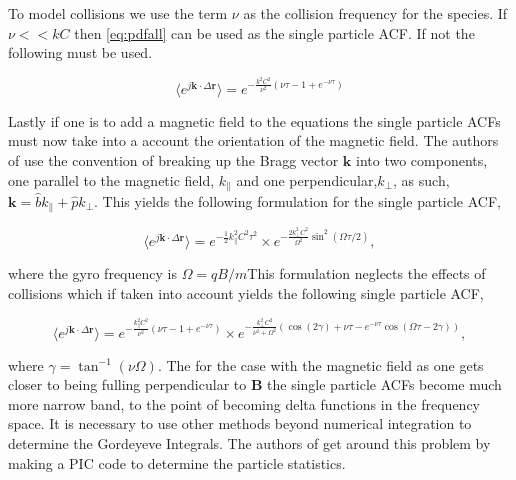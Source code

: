 \documentclass[10pt]{report}
\begin{document}
 To model collisions we use the term $\nu$ as the collision frequency for the species. If $\nu<<kC$ then \ref{eq:pdfall} can be used as the single particle ACF. If not the following must be used.
 
 \begin{equation}
 \label{eq:colspacf}
 \langle e^{j\mathbf{k}\cdot\Delta \mathbf{r}}\rangle = e^{-\frac{k^2C^2}{\nu^2}\left( \nu \tau-1+e^{-\nu\tau}\right)}
 \end{equation}
 
Lastly if one is to add a magnetic field to the equations the single particle ACFs must now take into a account the orientation of the magnetic field. The authors of \cite{kudeki:milla:1} use the convention of breaking up the Bragg vector $\mathbf{k}$ into two components, one parallel to the magnetic field, $k_{\parallel}$ and one perpendicular,$k_{\perp}$, as such, $\mathbf{k}= \hat{b}k_{\parallel}+\hat{p}k_{\perp}$. This yields the following formulation for the single particle ACF,

 \begin{equation}
\label{eq:pdfmag}
\langle e^{j\mathbf{k}\cdot\Delta \mathbf{r}}\rangle= e^{-\frac{1}{2}k_{\parallel}^2C^2 \tau^2}\times e^{-\frac{2k_{\perp}^2C^2}{\Omega^2} \sin^2(\Omega\tau/2)},
\end{equation}

\noindent where the gyro frequency is $\Omega = qB/m$This formulation neglects the effects of collisions which if taken into account yields the following single particle ACF,

\begin{equation}
\label{eq:colspacf}
\langle e^{j\mathbf{k}\cdot\Delta \mathbf{r}}\rangle = e^{-\frac{k_\parallel^2C^2}{\nu^2}\left( \nu \tau-1+e^{-\nu\tau}\right)}\times e^{-\frac{k_\perp^2C^2}{\nu^2+\Omega^2}\left(\cos(2\gamma) + \nu \tau-e^{-\nu\tau}\cos(\Omega\tau-2\gamma)\right)},
\end{equation}
 
\noindent where $\gamma = \tan^{-1}(\nu\Omega)$. The for the case with the magnetic field as one gets closer to being fulling perpendicular to $\mathbf{B}$ the single particle ACFs become much more narrow band, to the point of becoming delta functions in the frequency space. It is necessary to use other methods beyond numerical integration to determine the Gordeyeve Integrals. The authors of \cite{kudeki:milla:2} get around this problem by making a PIC code to determine the particle statistics. 


\end{document}
